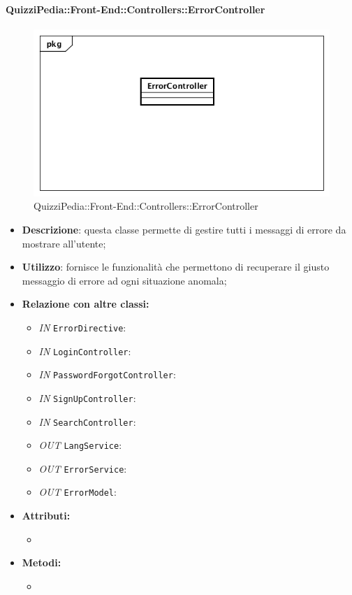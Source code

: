 \paragraph{QuizziPedia::Front-End::Controllers::ErrorController}
\begin{figure}
	\centering
	\includegraphics[scale=0.45]{UML/Classi/Front-End/QuizziPedia_Front-end_Controller_ErrorController.png}
	\caption{QuizziPedia::Front-End::Controllers::ErrorController}
\end{figure}
\begin{itemize}
	\item \textbf{Descrizione}: questa classe permette di gestire tutti i messaggi di errore da mostrare all'utente;
	\item \textbf{Utilizzo}: fornisce le funzionalità che permettono di recuperare il giusto messaggio di errore ad ogni situazione anomala;
	\item \textbf{Relazione con altre classi:}
	\begin{itemize}
		\item \textit{IN} \texttt{ErrorDirective}: 
		\item \textit{IN} \texttt{LoginController}: 
		\item \textit{IN} \texttt{PasswordForgotController}: 
		\item \textit{IN} \texttt{SignUpController}: 
		\item \textit{IN} \texttt{SearchController}: 
		\item \textit{OUT} \texttt{LangService}: 
		\item \textit{OUT} \texttt{ErrorService}: 
		\item \textit{OUT} \texttt{ErrorModel}:
	\end{itemize}
	\item \textbf{Attributi:}
	\begin{itemize}
		\item 
	\end{itemize}
	\item \textbf{Metodi:}
	\begin{itemize}
		\item 
	\end{itemize}
\end{itemize}

